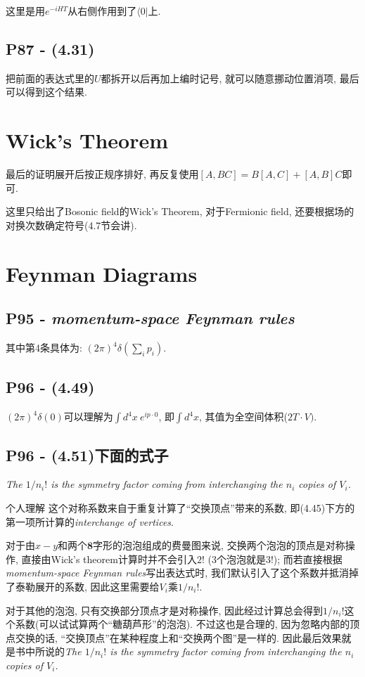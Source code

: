 这里是用$e^{-iHT}$从右侧作用到了$\langle 0|$上.

\subsection{P87 - (4.31)}

把前面的表达式里的$U$都拆开以后再加上编时记号, 就可以随意挪动位置消项, 最后可以得到这个结果.

\section{Wick's Theorem}

最后的证明展开后按正规序排好, 再反复使用$[A, BC] = B[A, C] + [A, B]C$即可.

这里只给出了Bosonic field的Wick's Theorem, 对于Fermionic field, 还要根据场的对换次数确定符号(4.7节会讲).

\section{Feynman Diagrams}

\subsection{P95 - \textit{momentum-space Feynman rules}}

其中第4条具体为: $(2\pi)^4 \delta(\sum\limits_i p_i)$.

\subsection{P96 - (4.49)}

$(2\pi)^4 \delta(0)$可以理解为$\int d^4x\ e^{ip\cdot 0}$, 即$\int d^4x$, 其值为全空间体积($2T\cdot V)$.

\subsection{P96 - (4.51)下面的式子}

\textit{The $1/n_i !$ is the symmetry factor coming from interchanging the $n_i$ copies of $V_i$.}

\begin{mybox}{个人理解}
  这个对称系数来自于重复计算了“交换顶点”带来的系数, 即(4.45)下方的第一项所计算的\textit{interchange of vertices}.

  \mbox{}

  对于由$x-y$和两个$\mathbf{8}$字形的泡泡组成的费曼图来说, 交换两个泡泡的顶点是对称操作, 直接由Wick's theorem计算时并不会引入$2!$ (3个泡泡就是$3!$); 而若直接根据\textit{momentum-space Feynman rules}写出表达式时, 我们默认引入了这个系数并抵消掉了泰勒展开的系数, 因此这里需要给$V_i$乘$1/n_i !$.

  \mbox{}

  对于其他的泡泡, 只有交换部分顶点才是对称操作, 因此经过计算总会得到$1/n_i !$这个系数(可以试试算两个“糖葫芦形”的泡泡).
  不过这也是合理的, 因为忽略内部的顶点交换的话, “交换顶点”在某种程度上和“交换两个图”是一样的.
  因此最后效果就是书中所说的\textit{The $1/n_i !$ is the symmetry factor coming from interchanging the $n_i$ copies of $V_i$.}
\end{mybox}

